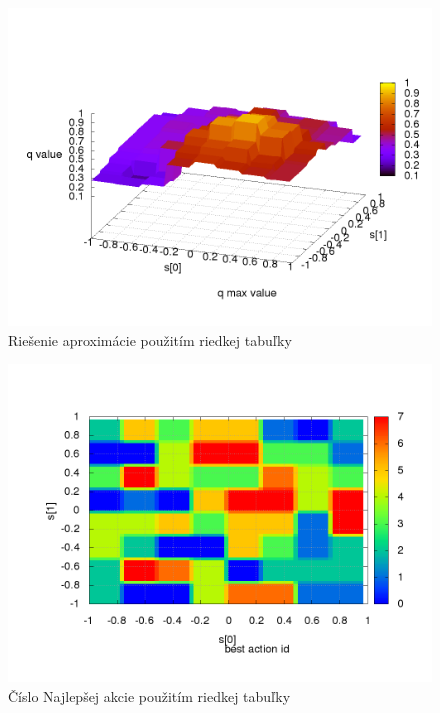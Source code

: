 \begin{figure}[!htb]
\centering
\includegraphics[scale=.4]{../../results_q_learning/map_2/function_type_1/iterations_10/q_learning_result.png}
\caption{Riešenie aproximácie použitím riedkej tabuľky}
\label{img:experiment_sparse_table}
\end{figure}


\begin{figure}[!htb]
\centering
\includegraphics[scale=.4]{../../results_q_learning/map_2/function_type_1/iterations_10/action_best_value_log_surface.png}
\caption{Číslo Najlepšej akcie použitím riedkej tabuľky}
\label{img:experiment_sparse_table_actions}
\end{figure}

